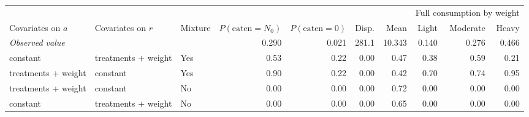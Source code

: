 \begin{tabular}{lllrrrrrrr}
\toprule
&&&&&&&\multicolumn{3}{c}{Full consumption by weight} \\
\cmidrule(l){8-10}
Covariates on $a$ & Covariates on $r$ & Mixture & $P(\text{eaten}{=}N_0)$ & $P(\text{eaten}{=}0)$ & Disp. & Mean & Light & Moderate & Heavy \\
\midrule
\multicolumn{3}{l}{\textit{Observed value}} & 0.290 & 0.021 & 281.1 & 10.343 & 0.140 & 0.276 & 0.466 \\
\midrule
constant & treatments + weight & Yes & 0.53 & 0.22 & 0.00 & 0.47 & 0.38 & 0.59 & 0.21 \\
treatments + weight & constant & Yes & 0.90 & 0.22 & 0.00 & 0.42 & 0.70 & 0.74 & 0.95 \\
treatments + weight & constant & No & 0.00 & 0.00 & 0.00 & 0.72 & 0.00 & 0.00 & 0.00 \\
constant & treatments + weight & No & 0.00 & 0.00 & 0.00 & 0.65 & 0.00 & 0.00 & 0.00 \\
\bottomrule
\end{tabular}
